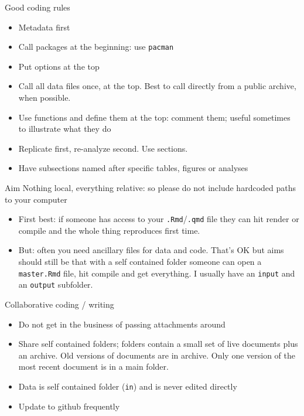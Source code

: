 \documentclass[
  11pt,
  ignorenonframetext,
]{beamer}
\providecommand{\tightlist}{%
  \setlength{\itemsep}{0pt}\setlength{\parskip}{0pt}}\usepackage{longtable,booktabs,array}
\begin{document}
\begin{frame}[fragile]{Good coding rules}
\protect\hypertarget{good-coding-rules-1}{}
\begin{itemize}
\tightlist
\item
  Metadata first
\item
  Call packages at the beginning: use \texttt{pacman}
\item
  Put options at the top
\item
  Call all data files once, at the top. Best to call directly from a
  public archive, when possible.\\
\item
  Use functions and define them at the top: comment them; useful
  sometimes to illustrate what they do
\item
  Replicate first, re-analyze second. Use sections.
\item
  Have subsections named after specific tables, figures or analyses
\end{itemize}
\end{frame}

\begin{frame}[fragile]{Aim}
\protect\hypertarget{aim}{}
Nothing local, everything relative: so please do not include hardcoded
paths to your computer

\begin{itemize}
\item
  First best: if someone has access to your \texttt{.Rmd}/\texttt{.qmd}
  file they can hit render or compile and the whole thing reproduces
  first time.
\item
  But: often you need ancillary files for data and code. That's OK but
  aims should still be that with a self contained folder someone can
  open a \texttt{master.Rmd} file, hit compile and get everything. I
  usually have an \texttt{input} and an \texttt{output} subfolder.
\end{itemize}
\end{frame}

\begin{frame}[fragile]{Collaborative coding / writing}
\protect\hypertarget{collaborative-coding-writing}{}
\begin{itemize}
\tightlist
\item
  Do not get in the business of passing attachments around
\item
  Share self contained folders; folders contain a small set of live
  documents plus an archive. Old versions of documents are in archive.
  Only one version of the most recent document is in a main folder.
\item
  Data is self contained folder (\texttt{in}) and is never edited
  directly
\item
  Update to github frequently
\end{itemize}
\end{frame}
\end{document}

